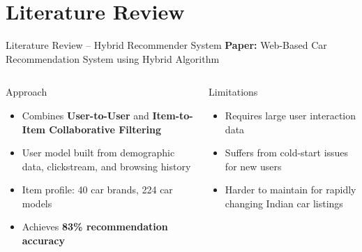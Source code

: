 \documentclass[aspectratio=169]{beamer}
\begin{document}
\section{Literature Review}
\begin{frame}{Literature Review -- Hybrid Recommender System}
  \textbf{Paper:} Web-Based Car Recommendation System using Hybrid Algorithm
  \vspace{0.5em}
  \begin{columns}[t]
      \begin{block}{Approach}
        \begin{itemize}
          \item Combines \textbf{User-to-User} and \textbf{Item-to-Item Collaborative Filtering}
          \item User model built from demographic data, clickstream, and browsing history
          \item Item profile: 40 car brands, 224 car models
          \item Achieves \textbf{83\% recommendation accuracy}
        \end{itemize}
      \end{block}
      \begin{alertblock}{Limitations}
        \begin{itemize}
          \item Requires large user interaction data
          \item Suffers from cold-start issues for new users
          \item Harder to maintain for rapidly changing Indian car listings
        \end{itemize}
      \end{alertblock}
  \end{columns}
\end{frame}
\end{document}

